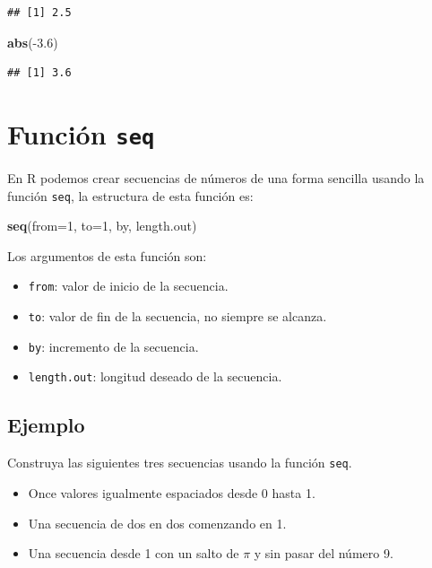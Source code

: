 \documentclass[10pt,]{krantz}
\makeatletter
\newenvironment{Shaded}{\begin{snugshade}}{\end{snugshade}}
\newcommand{\KeywordTok}[1]{\textcolor[rgb]{0.13,0.29,0.53}{\textbf{{#1}}}}
\newcommand{\DataTypeTok}[1]{\textcolor[rgb]{0.13,0.29,0.53}{{#1}}}
\newcommand{\DecValTok}[1]{\textcolor[rgb]{0.00,0.00,0.81}{{#1}}}
\newcommand{\FloatTok}[1]{\textcolor[rgb]{0.00,0.00,0.81}{{#1}}}
\newcommand{\NormalTok}[1]{{#1}}
\providecommand{\tightlist}{%
  \setlength{\itemsep}{0pt}\setlength{\parskip}{0pt}}
\let\proglang=\textsf
\newenvironment{kframe}{%
\medskip{}
\setlength{\fboxsep}{.8em}
 \def\at@end@of@kframe{}%
 \ifinner\ifhmode%
  \def\at@end@of@kframe{\end{minipage}}%
  \begin{minipage}{\columnwidth}%
 \fi\fi%
 \def\FrameCommand##1{\hskip\@totalleftmargin \hskip-\fboxsep
 \colorbox{shadecolor}{##1}\hskip-\fboxsep
     \hskip-\linewidth \hskip-\@totalleftmargin \hskip\columnwidth}%
 \MakeFramed {\advance\hsize-\width
   \@totalleftmargin\z@ \linewidth\hsize
   \@setminipage}}%
 {\par\unskip\endMakeFramed%
 \at@end@of@kframe}
\renewenvironment{Shaded}{\begin{kframe}}{\end{kframe}}
\makeatother
\begin{document}
\begin{verbatim}
## [1] 2.5
\end{verbatim}

\begin{Shaded}
\begin{Highlighting}[]
\KeywordTok{abs}\NormalTok{(-}\FloatTok{3.6}\NormalTok{)}
\end{Highlighting}
\end{Shaded}

\begin{verbatim}
## [1] 3.6
\end{verbatim}

\section{\texorpdfstring{Función \texttt{seq} 
}{Función seq  }}\label{funcion-seq}

En \proglang{R} podemos crear secuencias de números de una forma
sencilla usando la función \texttt{seq}, la estructura de esta función
es:

\begin{Shaded}
\begin{Highlighting}[]
\KeywordTok{seq}\NormalTok{(}\DataTypeTok{from=}\DecValTok{1}\NormalTok{, }\DataTypeTok{to=}\DecValTok{1}\NormalTok{, by, length.out)}
\end{Highlighting}
\end{Shaded}

Los argumentos de esta función son:

\begin{itemize}
\tightlist
\item
  \texttt{from}: valor de inicio de la secuencia.
\item
  \texttt{to}: valor de fin de la secuencia, no siempre se alcanza.
\item
  \texttt{by}: incremento de la secuencia.
\item
  \texttt{length.out}: longitud deseado de la secuencia.
\end{itemize}

\subsection*{Ejemplo}\label{ejemplo-3}


Construya las siguientes tres secuencias usando la función \texttt{seq}.

\begin{itemize}
\tightlist
\item
  Once valores igualmente espaciados desde 0 hasta 1.
\item
  Una secuencia de dos en dos comenzando en 1.
\item
  Una secuencia desde 1 con un salto de \(\pi\) y sin pasar del número
  9.
\end{itemize}
\end{document}
